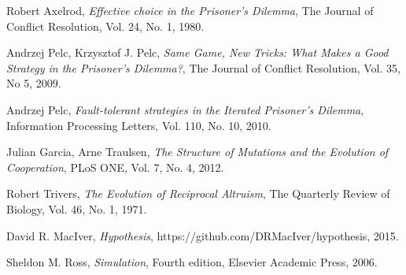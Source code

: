 \documentclass[a4paper,12pt]{article}
\begin{document}
\begin{thebibliography}{9}

        Robert Axelrod,
        \emph{Effective choice in the Prisoner's Dilemma},
        The Journal of Conflict Resolution,
        Vol. 24,
        No. 1,
        1980.

        Andrzej Pelc, Krzysztof J. Pelc,
        \emph{Same Game, New Tricks: What Makes a Good Strategy in the Prisoner's Dilemma?},
        The Journal of Conflict Resolution,
        Vol. 35,
        No 5,
        2009.

        Andrzej Pelc,
        \emph{Fault-tolerant strategies in the Iterated Prisoner's Dilemma},
        Information Processing Letters,
        Vol. 110,
        No. 10,
        2010.

        Julian Garcia, Arne Traulsen,
        \emph{The Structure of Mutations and the Evolution of Cooperation},
        PLoS ONE,
        Vol. 7,
        No. 4,
        2012.

        Robert Trivers,
        \emph{The Evolution of Reciprocal Altruism},
        The Quarterly Review of Biology,
        Vol. 46,
        No. 1,
        1971.

        David R. MacIver,
        \emph{Hypothesis},
        https://github.com/DRMacIver/hypothesis,
        2015.

        Sheldon M. Ross,
        \emph{Simulation},
        Fourth edition,
        Elsevier Academic Press,
        2006.

\end{thebibliography}
\end{document}

